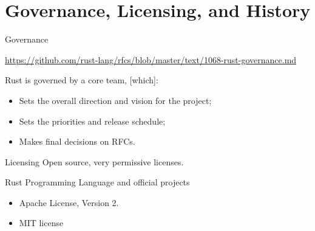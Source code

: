 \documentclass{beamer}
\begin{document}
\section{Governance, Licensing, and History} 




\begin{frame}{Governance} 

\url{https://github.com/rust-lang/rfcs/blob/master/text/1068-rust-governance.md}
\begin{block}{}
Rust is governed by a core team, [which]:
\begin{itemize} [label=$\bullet$] 
\item    Sets the overall direction and vision for the project;
\item    Sets the priorities and release schedule;
\item    Makes final decisions on RFCs.
\end{itemize}
\end{block}
\end{frame} 



\begin{frame}{Licensing} 
Open source, very permissive licenses.


\begin{block}{Rust Programming Language and official projects}
\begin{itemize}[label=$\bullet$] 
\item
Apache License, Version 2.
\item
MIT license
\end{itemize}
\end{block}


\end{frame}
\end{document}
